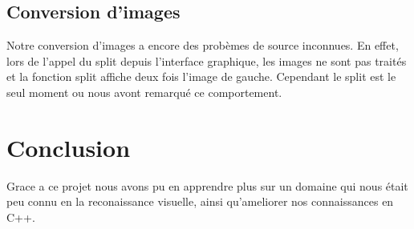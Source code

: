 \documentclass[a4paper]{article}
\begin{document}
\subsection*{Conversion d'images}

Notre conversion d'images a encore des probèmes de source inconnues. En effet, lors de l'appel du split depuis l'interface graphique, les images ne sont pas traités et la fonction split affiche deux fois l'image de gauche. Cependant le split est le seul moment ou nous avont remarqué ce comportement.


\section{Conclusion}

Grace a ce projet nous avons pu en apprendre plus sur un domaine qui nous était peu connu en la reconaissance visuelle, ainsi qu'ameliorer nos connaissances en C++.

\end{document}
